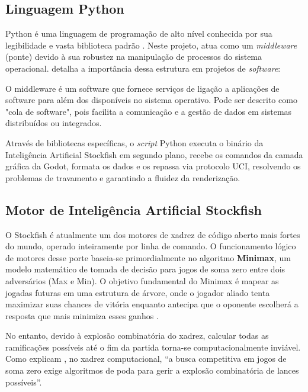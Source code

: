 \subsection{Linguagem Python}

Python é uma linguagem de programação de alto nível conhecida por sua legibilidade e vasta biblioteca padrão \cite{VanRossum2009}. Neste projeto, atua como um \textit{middleware} (ponte) devido à sua robustez na manipulação de processos do sistema operacional.  detalha a importância dessa estrutura em projetos de \textit{software}:

\begin{citacao}
	O middleware é um software que fornece serviços de ligação a aplicações de software para além dos disponíveis no sistema operativo. Pode ser descrito como "cola de software", pois facilita a comunicação e a gestão de dados em sistemas distribuídos ou integrados.
\end{citacao}

Através de bibliotecas específicas, o \textit{script} Python executa o binário da Inteligência Artificial Stockfish em segundo plano, recebe os comandos da camada gráfica da Godot, formata os dados e os repassa via protocolo UCI, resolvendo os problemas de travamento e garantindo a fluidez da renderização.

\subsection{Motor de Inteligência Artificial Stockfish}
\label{sec:stockfish}

O Stockfish é atualmente um dos motores de xadrez de código aberto mais fortes do mundo, operado inteiramente por linha de comando. O funcionamento lógico de motores desse porte baseia-se primordialmente no algoritmo \textbf{Minimax}, um modelo matemático de tomada de decisão para jogos de soma zero entre dois adversários (Max e Min). O objetivo fundamental do Minimax é mapear as jogadas futuras em uma estrutura de árvore, onde o jogador aliado tenta maximizar suas chances de vitória enquanto antecipa que o oponente escolherá a resposta que mais minimiza esses ganhos \cite{RussellNorvig2021}.

No entanto, devido à explosão combinatória do xadrez, calcular todas as ramificações possíveis até o fim da partida torna-se computacionalmente inviável. Como explicam , no xadrez computacional, ``a busca competitiva em jogos de soma zero exige algoritmos de poda para gerir a explosão combinatória de lances possíveis''. 

